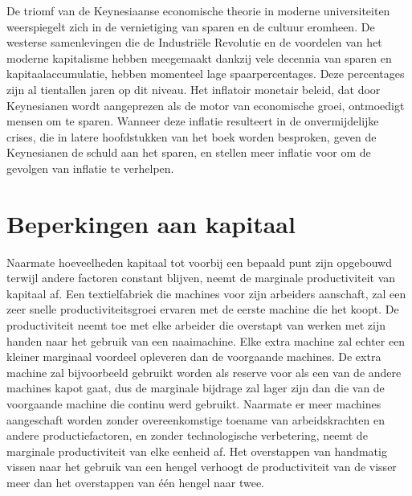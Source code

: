De triomf van de Keynesiaanse economische theorie in moderne universiteiten weerspiegelt zich in de vernietiging van sparen en de cultuur eromheen. De westerse samenlevingen die de Industriële Revolutie en de voordelen van het moderne kapitalisme hebben meegemaakt dankzij vele decennia van sparen en kapitaalaccumulatie, hebben momenteel lage spaarpercentages. Deze percentages zijn al tientallen jaren op dit niveau. Het inflatoir monetair beleid, dat door Keynesianen wordt aangeprezen als de motor van economische groei, ontmoedigt mensen om te sparen. Wanneer deze inflatie resulteert in de onvermijdelijke crises, die in latere hoofdstukken van het boek worden besproken, geven de Keynesianen de schuld aan het sparen, en stellen meer inflatie voor om de gevolgen van inflatie te verhelpen.

\hypertarget{beperkingen-aan-kapitaal}{%
\section{Beperkingen aan kapitaal}\label{beperkingen-aan-kapitaal}}

Naarmate hoeveelheden kapitaal tot voorbij een bepaald punt zijn opgebouwd terwijl andere factoren constant blijven, neemt de marginale productiviteit van kapitaal af. Een textielfabriek die machines voor zijn arbeiders aanschaft, zal een zeer snelle productiviteitsgroei ervaren met de eerste machine die het koopt. De productiviteit neemt toe met elke arbeider die overstapt van werken met zijn handen naar het gebruik van een naaimachine. Elke extra machine zal echter een kleiner marginaal voordeel opleveren dan de voorgaande machines. De extra machine zal bijvoorbeeld gebruikt worden als reserve voor als een van de andere machines kapot gaat, dus de marginale bijdrage zal lager zijn dan die van de voorgaande machine die continu werd gebruikt. Naarmate er meer machines aangeschaft worden zonder overeenkomstige toename van arbeidskrachten en andere productiefactoren, en zonder technologische verbetering, neemt de marginale productiviteit van elke eenheid af. Het overstappen van handmatig vissen naar het gebruik van een hengel verhoogt de productiviteit van de visser meer dan het overstappen van één hengel naar twee.

